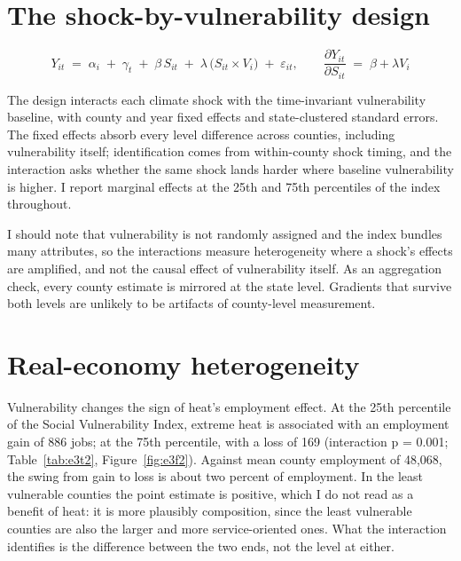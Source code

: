 \documentclass[a4paper,11pt]{report}
\begin{document}
\FloatBarrier
\section{The shock-by-vulnerability design}

\begin{equation}
Y_{it} \;=\; \alpha_i \;+\; \gamma_t \;+\; \beta \, S_{it}
\;+\; \lambda \,\bigl(S_{it} \times V_i\bigr) \;+\; \varepsilon_{it},
\qquad \frac{\partial Y_{it}}{\partial S_{it}} \;=\; \beta + \lambda V_i
\label{eq:interaction}
\end{equation}

The design interacts each climate shock with the time-invariant vulnerability baseline, with county and year fixed effects and state-clustered standard errors. The fixed effects absorb every level difference across counties, including vulnerability itself; identification comes from within-county shock timing, and the interaction asks whether the same shock lands harder where baseline vulnerability is higher. I report marginal effects at the 25th and 75th percentiles of the index throughout.

I should note that vulnerability is not randomly assigned and the index bundles many attributes, so the interactions measure heterogeneity where a shock's effects are amplified, and not the causal effect of vulnerability itself. As an aggregation check, every county estimate is mirrored at the state level. Gradients that survive both levels are unlikely to be artifacts of county-level measurement.

\FloatBarrier
\section{Real-economy heterogeneity}

Vulnerability changes the sign of heat's employment effect. At the 25th percentile of the Social Vulnerability Index, extreme heat is associated with an employment gain of 886 jobs; at the 75th percentile, with a loss of 169 (interaction p = 0.001; Table~\ref{tab:e3t2}, Figure~\ref{fig:e3f2}). Against mean county employment of 48,068, the swing from gain to loss is about two percent of employment. In the least vulnerable counties the point estimate is positive, which I do not read as a benefit of heat: it is more plausibly composition, since the least vulnerable counties are also the larger and more service-oriented ones. What the interaction identifies is the difference between the two ends, not the level at either.
\end{document}
